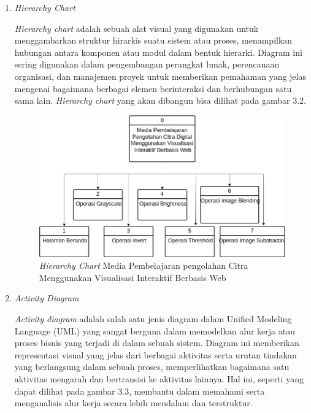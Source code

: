 \begin{enumerate}[leftmargin=1cm, itemindent=0.6cm,labelwidth=15pt, labelsep=5pt, listparindent=1cm,align=left]
\item\textit{Hierarchy Chart}

\textit{Hierarchy chart} adalah sebuah alat visual yang digunakan untuk menggambarkan struktur hirarkis suatu sistem atau proses, menampilkan hubungan antara komponen atau modul dalam bentuk hierarki. Diagram ini sering digunakan dalam pengembangan perangkat lunak, perencanaan organisasi, dan manajemen proyek untuk memberikan pemahaman yang jelas mengenai bagaimana berbagai elemen berinteraksi dan berhubungan satu sama lain. \textit{Hierarchy chart} yang akan dibangun bisa dilihat pada gambar 3.2.

          \begin{figure}[ht]
    	      \includegraphics[width=15cm, center]{images/Hierarchy-Chart.png}
              \caption{\textit{Hierarchy Chart} Media Pembelajaran pengolahan Citra Menggunakan Visualisasi Interaktif Berbasis Web}
          \end{figure}

\item\textit{Activity Diagram}

\textit{Activity diagram} adalah salah satu jenis diagram dalam Unified Modeling Language (UML) yang sangat berguna dalam memodelkan alur kerja atau proses bisnis yang terjadi di dalam sebuah sistem. Diagram ini memberikan representasi visual yang jelas dari berbagai aktivitas serta urutan tindakan yang berlangsung dalam sebuah proses, memperlihatkan bagaimana satu aktivitas mengarah dan bertransisi ke aktivitas lainnya. Hal ini, seperti yang dapat dilihat pada gambar 3.3, membantu dalam memahami serta menganalisis alur kerja secara lebih mendalam dan terstruktur.


\end{enumerate}
